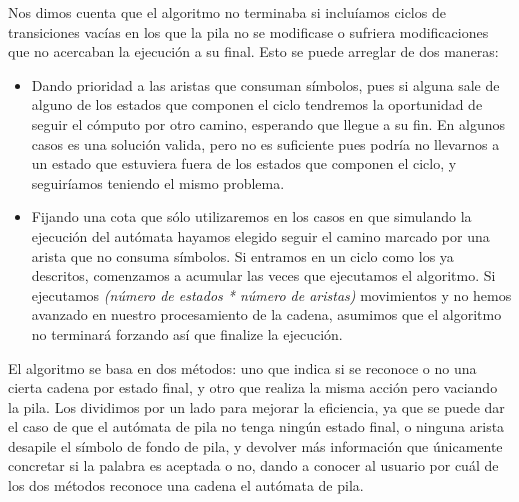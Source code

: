 \documentclass[12pt,a4paper,spanish]{book}
\begin{document}
Nos dimos cuenta que el algoritmo no terminaba si inclu\'iamos ciclos de transiciones vac\'ias en los que la pila no se modificase o sufriera modificaciones que no acercaban la ejecuci\'on a su final. Esto se puede arreglar de dos maneras:

\begin{itemize}

\item Dando prioridad a las aristas que consuman s\'imbolos, pues si alguna sale de alguno de los estados que componen el ciclo tendremos la oportunidad de seguir el c\'omputo por otro camino, esperando que llegue a su fin. En algunos casos es una soluci\'on valida, pero no es suficiente pues podr\'ia no llevarnos a un estado que estuviera fuera de los estados que componen el ciclo, y seguir\'iamos teniendo el mismo problema.

\item Fijando una cota que s\'olo utilizaremos en los casos en que simulando la ejecuci\'on del aut\'omata hayamos elegido seguir el camino marcado por una arista que no consuma s\'imbolos. Si entramos en un ciclo como los ya descritos, comenzamos a acumular las veces que ejecutamos el algoritmo. Si ejecutamos {\it (n\'umero de estados * n\'umero de aristas)} movimientos y no hemos avanzado en nuestro procesamiento de la cadena, asumimos que el algoritmo no terminar\'a forzando as\'i que finalize la ejecuci\'on.\\

\end{itemize}


El algoritmo se basa en dos m\'etodos: uno que indica si se reconoce o no una cierta cadena por estado final, y otro que realiza la misma acci\'on pero vaciando la pila. Los dividimos por un lado para mejorar la eficiencia, ya que se puede dar el caso de que el aut\'omata de pila no tenga ning\'un estado final, o ninguna arista desapile el s\'imbolo de fondo de pila, y devolver m\'as informaci\'on que \'unicamente concretar si la palabra es aceptada o no, dando a conocer al usuario por cu\'al de los dos m\'etodos reconoce una cadena el aut\'omata de pila. \\
\end{document}
